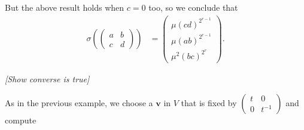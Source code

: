 But the above result holds when $c=0$ too, so we conclude that
\begin{align*}
\sigma\left(\left(\begin{matrix} a & b \\ c & d \end{matrix}\right)\right) &=
\left(\begin{matrix}  \mu(cd)^{2^{r-1}}  \\ \mu\left(ab \right)^{2^{r-1}} \\ \mu^2\left( bc \right)^{2^r} \end{matrix}\right). 
\end{align*}

\emph{[Show converse is true]}

As in the previous example, we choose a $\mathbf{v}$ in $V$ that is fixed by $\left(\begin{matrix} t & 0 \\ 0 & t^{-1}\end{matrix}\right)$ and compute
